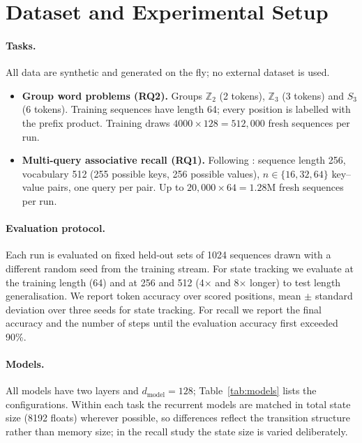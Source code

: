 \section{Dataset and Experimental Setup}
\label{sec:setup}

\paragraph{Tasks.} All data are synthetic and generated on the fly; no external dataset is used.
\begin{itemize}
  \item \textbf{Group word problems (RQ2).} Groups $\mathbb{Z}_2$ (2 tokens), $\mathbb{Z}_3$ (3 tokens) and $S_3$
        (6 tokens). Training sequences have length 64; every position is labelled with the prefix product.
        Training draws $4000\times128 = 512{,}000$ fresh sequences per run.
  \item \textbf{Multi-query associative recall (RQ1).} Following \citet{arora2024zoology}: sequence length 256,
        vocabulary 512 (255 possible keys, 256 possible values), $n\in\{16,32,64\}$ key--value pairs, one query
        per pair. Up to $20{,}000\times64 = 1.28$M fresh sequences per run.
\end{itemize}

\paragraph{Evaluation protocol.} Each run is evaluated on fixed held-out sets of 1024 sequences drawn with a
different random seed from the training stream. For state tracking we evaluate at the training length (64)
and at 256 and 512 (4$\times$ and 8$\times$ longer) to test length generalisation. We report token accuracy
over scored positions, mean $\pm$ standard deviation over three seeds for state tracking. For recall we
report the final accuracy and the number of steps until the evaluation accuracy first exceeded 90\%.

\paragraph{Models.} All models have two layers and $d_{\text{model}}=128$; Table~\ref{tab:models} lists the
configurations. Within each task the recurrent models are matched in total state size (8192 floats) wherever
possible, so differences reflect the transition structure rather than memory size; in the recall study the
state size is varied deliberately.

